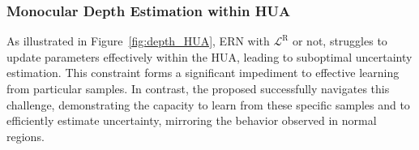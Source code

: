 


\subsubsection{Monocular Depth Estimation within HUA}
As illustrated in Figure~\ref{fig:depth_HUA}, ERN with $\mathcal{L}^{\mathrm{R}}$ or not, struggles to update parameters effectively within the HUA, leading to suboptimal uncertainty estimation. This constraint forms a significant impediment to effective learning from particular samples. In contrast, the proposed \ours successfully navigates this challenge, demonstrating the capacity to learn from these specific samples and to efficiently estimate uncertainty, mirroring the behavior observed in normal regions.



